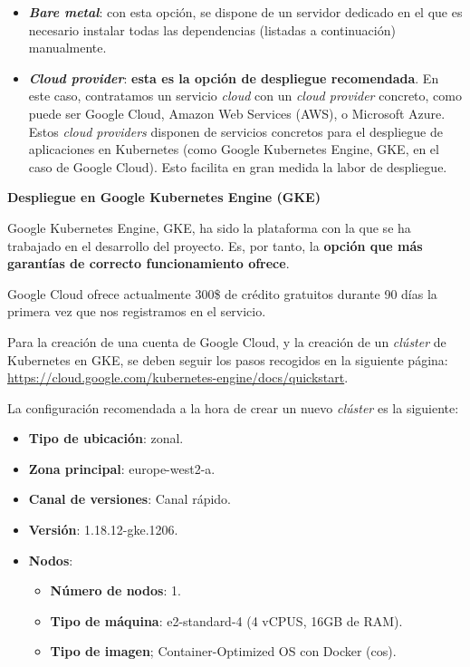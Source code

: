 \vspace{-0.2cm}
\begin{itemize} [\textbullet]
	\item \textbf{\emph{Bare metal}}: con esta opción, se dispone de un servidor dedicado en el que es necesario instalar todas las dependencias (listadas a continuación) manualmente.

	\item \textbf{\emph{Cloud provider}}: \textbf{esta es la opción de despliegue recomendada}. En este caso, contratamos un servicio \emph{cloud} con un \emph{cloud provider} concreto, como puede ser Google Cloud, Amazon Web Services (AWS), o Microsoft Azure. Estos \emph{cloud providers} disponen de servicios concretos para el despliegue de aplicaciones en Kubernetes (como Google Kubernetes Engine, GKE, en el caso de Google Cloud). Esto facilita en gran medida la labor de despliegue.
\end{itemize}

\vspace{0.3cm}
\noindent
\textbf{Despliegue en Google Kubernetes Engine (GKE)}

Google Kubernetes Engine, GKE, ha sido la plataforma con la que se ha trabajado en el desarrollo del proyecto. Es, por tanto, la \textbf{opción que más garantías de correcto funcionamiento ofrece}.

Google Cloud ofrece actualmente 300\$ de crédito gratuitos durante 90 días la primera vez que nos registramos en el servicio.

Para la creación de una cuenta de Google Cloud, y la creación de un \emph{clúster} de Kubernetes en GKE, se deben seguir los pasos recogidos en la siguiente página: \href{https://cloud.google.com/kubernetes-engine/docs/quickstart}{https://cloud.google.com/kubernetes-engine/docs/quickstart}.

La configuración recomendada a la hora de crear un nuevo \emph{clúster} es la siguiente:

\vspace{-0.2cm}
\begin{itemize} [\textbullet]
	\tightlist
	\item \textbf{Tipo de ubicación}: zonal.
	\item \textbf{Zona principal}: europe-west2-a.
	\item \textbf{Canal de versiones}: Canal rápido.
	\item \textbf{Versión}: 1.18.12-gke.1206.
	\item \textbf{Nodos}:
	\begin{itemize} [◦]
		\tightlist
		\item \textbf{Número de nodos}: 1.
		\item \textbf{Tipo de máquina}: e2-standard-4 (4 vCPUS, 16GB de RAM).
		\item \textbf{Tipo de imagen}; Container-Optimized OS con Docker (cos).
	\end{itemize}
\end{itemize}

